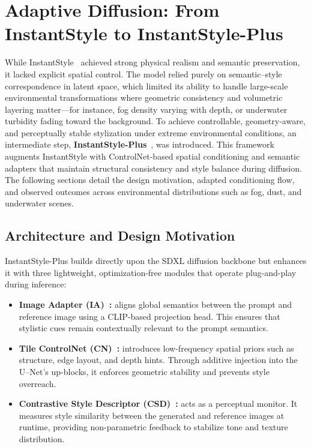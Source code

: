 \chapter{Adaptive Diffusion: From InstantStyle to InstantStyle-Plus}
\label{chap:adaptive_solutions}

\noindent
While InstantStyle~\cite{wang2024instantstyle} achieved strong physical realism and semantic preservation, it lacked explicit spatial control.  
The model relied purely on semantic–style correspondence in latent space, which limited its ability to handle large-scale environmental transformations where geometric consistency and volumetric layering matter—for instance, fog density varying with depth, or underwater turbidity fading toward the background.  
To achieve controllable, geometry-aware, and perceptually stable stylization under extreme environmental conditions, an intermediate step, \textbf{InstantStyle-Plus}~\cite{wang2024instantstyleplus}, was introduced.  
This framework augments InstantStyle with ControlNet-based spatial conditioning and semantic adapters that maintain structural consistency and style balance during diffusion.  
The following sections detail the design motivation, adapted conditioning flow, and observed outcomes across environmental distributions such as fog, dust, and underwater scenes.

\section{Architecture and Design Motivation}

InstantStyle-Plus builds directly upon the SDXL diffusion backbone but enhances it with three lightweight, optimization-free modules that operate plug-and-play during inference:

\begin{itemize}
    \item \textbf{Image Adapter (IA)~\cite{chen2023ipadapter}:} aligns global semantics between the prompt and reference image using a CLIP-based projection head. This ensures that stylistic cues remain contextually relevant to the prompt semantics.
    \item \textbf{Tile ControlNet (CN)~\cite{zhang2023controlnet}:} introduces low-frequency spatial priors such as structure, edge layout, and depth hints. Through additive injection into the U–Net’s up-blocks, it enforces geometric stability and prevents style overreach.
    \item \textbf{Contrastive Style Descriptor (CSD)~\cite{somepalli2024csd}:} acts as a perceptual monitor. It measures style similarity between the generated and reference images at runtime, providing non-parametric feedback to stabilize tone and texture distribution.
\end{itemize}

